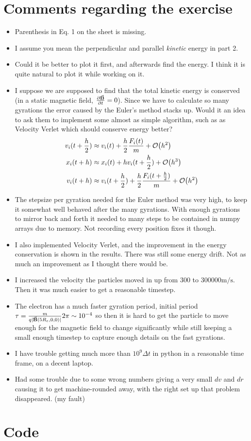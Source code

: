 \documentclass[x11names]{article}
\begin{document}
\section{Comments regarding the exercise}
      \begin{itemize}
            \item Parenthesis in Eq. 1 on the sheet is missing.
            \item I assume you mean the perpendicular and parallel \textit{kinetic} energy in part 2.
            \item Could it be better to plot it first, and afterwards find the energy. I think it is quite natural to plot it while working on it.
            \item I suppose we are supposed to find that the total kinetic energy is conserved (in a static magnetic field, \(\pdv{\va{B}}{t} = 0\)). Since we have to calculate so many gyrations the error caused by the Euler's method stacks up. Would it an idea to ask them to implement some almost as simple algorithm, such as as Velocity Verlet which should conserve energy better? 
            \begin{align*}
              v_i(t+\frac{h}{2}) &\approx v_i(t)  + \frac{h}{2}\frac{F_i(t)}{m} + \order{h^2} 
              \\
              x_i(t+h) &\approx x_i(t) + hv_i(t+ \frac{h} {2} ) + \order{h ^ 3}
              \\
              v_i(t+h) &\approx v_i(t+\frac{h}{2})  +  \frac{h}{2}\frac{F_i(t+ \frac{h}{2})}{m} + \order{h^2} 
            \end{align*}
            \item The stepsize per gyration needed for the Euler method was very high, to keep it somewhat well behaved after the many gyrations. With enough gyrations to mirror back and forth it needed to many steps to be contained in numpy arrays due to memory. Not recording every position fixes it though.
            \item I also implemented Velocity Verlet, and the improvement in the energy conservation is shown in the results. There was still some energy drift. Not as much an improvement as I thought there would be.
            \item I increased the velocity the particles moved in up from \(300\) to \(300 000 \si{\meter\per\second}\). Then it was much easier to get a reasonable timestep.
            \item The electron has a much faster gyration period, initial period \( \tau = \frac{m}{q|\va{B}( 5R_e, 0, 0 )|} 2\pi \sim 10^{-4}\) so then it is hard to get the particle to move enough for the magnetic field to change significantly while still keeping a small enough timestep to capture enough details on the fast gyrations.
            \item I have trouble getting much more than \(10^9 \Delta t\) in python in a reasonable time frame, on a decent laptop.
            \item Had some trouble due to some wrong numbers giving a very small \(dv\) and \(dr\) causing it to get machine-rounded away, with the right set up that problem disappeared. (my fault)
      \end{itemize}


\section{Code}
  \label{sec:code}
  

      
\end{document}
